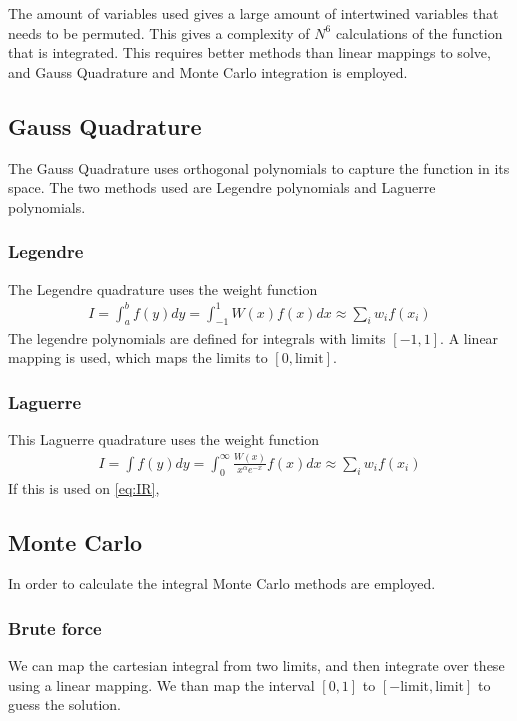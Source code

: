 \documentclass[11pt,a4paper,english,final]{article}
\numberwithin{equation}{section}
\begin{document}
The amount of variables used gives a large amount of intertwined 
variables that needs to be permuted. This gives a complexity of 
$N^6$ calculations of the function that is integrated. This 
requires better methods than linear mappings to solve, and Gauss 
Quadrature and Monte Carlo integration is employed.

\subsection{Gauss Quadrature}

The Gauss Quadrature uses orthogonal polynomials to capture the 
function in its space. The two methods used are Legendre polynomials 
and Laguerre polynomials.

\subsubsection{Legendre}

The Legendre 
quadrature uses the weight function 
\begin{gather}
I = \int_a^b f(y) dy = \int_{-1}^1 W(x) f(x) dx 
\approx \sum_i w_i f(x_i)
\end{gather}
The legendre polynomials are defined for integrals with limits $[-1,1]$.
A linear mapping is used, which maps the limits to $[0,\text{limit}]$.

\subsubsection{Laguerre}

This Laguerre quadrature uses the weight function
\begin{gather}
I = \int f(y) dy = \int_0^\infty \frac{W(x)}{x^\alpha e^{-x}} f(x) dx
\approx \sum_i w_i f(x_i)
\end{gather}
If this is used on \eqref{eq:IR}, 



\subsection{Monte Carlo}

In order to calculate the integral Monte Carlo methods are employed.

\subsubsection{Brute force}

We can map the cartesian integral from two limits, and then integrate 
over these using a linear mapping. We than map the interval $[0,1]$ to 
$[-\text{limit}, \text{limit}]$ to guess the solution.
\end{document}

